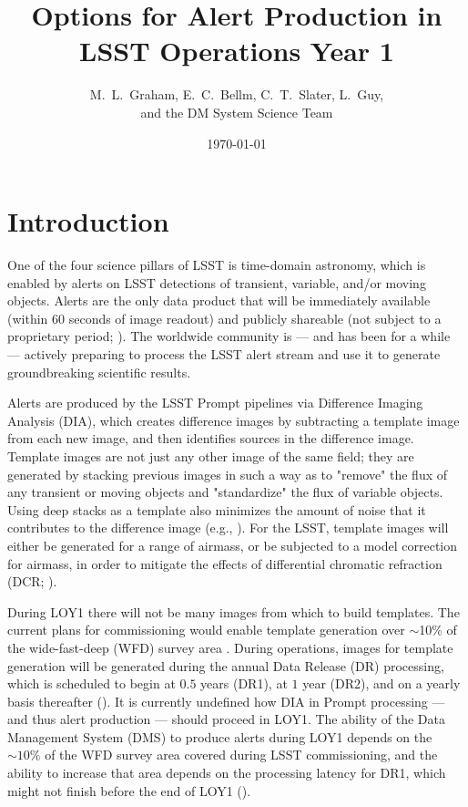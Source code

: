 \documentclass[DM,lsstdraft,toc]{lsstdoc}
\title[Alert Production in Year 1]{Options for Alert Production in \\ LSST Operations Year 1}
\author{M.~L.~Graham, E.~C.~Bellm, C.~T.~Slater, L.~Guy, \\ and the DM System Science Team}
\date{\today}
\begin{document}
\maketitle


\section{Introduction} \label{sec:intro}

One of the four science pillars of LSST is time-domain astronomy, which is enabled by alerts on LSST detections of transient, variable, and/or moving objects. Alerts are the only data product that will be immediately available (within $60$ seconds of image readout) and publicly shareable (not subject to a proprietary period; ).
The worldwide community is --- and has been for a while --- actively preparing to process the LSST alert stream and use it to generate groundbreaking scientific results. 

Alerts are produced by the LSST Prompt pipelines via Difference Imaging Analysis (DIA), which creates difference images by subtracting a template image from each new image, and then identifies sources in the difference image.
Template images are not just any other image of the same field; they are generated by stacking previous images in such a way as to "remove" the flux of any transient or moving objects and "standardize" the flux of variable objects.
Using deep stacks as a template also minimizes the amount of noise that it contributes to the difference image (e.g., ).
For the LSST, template images will either be generated for a range of airmass, or be subjected to a model correction for airmass, in order to mitigate the effects of differential chromatic refraction (DCR; ).

During LOY1 there will not be many images from which to build templates.
The current plans for commissioning would enable template generation over $\sim$10\% of the wide-fast-deep (WFD) survey area .
During operations, images for template generation will be generated during the annual Data Release (DR) processing, which is scheduled to begin at $0.5$ years (DR1), at $1$ year (DR2), and on a yearly basis thereafter ().
It is currently undefined how DIA in Prompt processing --- and thus alert production --- should proceed in LOY1.
The ability of the Data Management System (DMS) to produce alerts during LOY1 depends on the $\sim10\%$ of the WFD survey area covered during LSST commissioning, and the ability to increase that area depends on the processing latency for DR1, which might not finish before the end of LOY1 ().  
\end{document}
